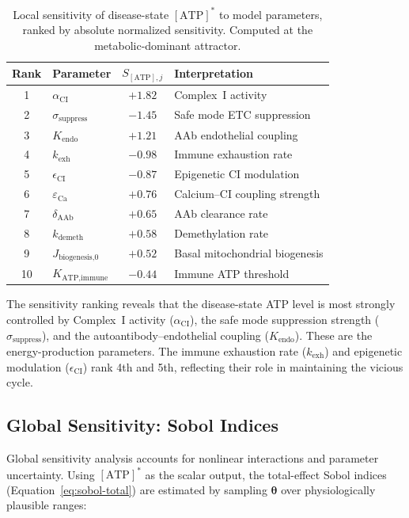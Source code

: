 \begin{table}[htbp]
\centering
\caption{Local sensitivity of disease-state $[\text{ATP}]^*$ to model parameters, ranked by absolute normalized sensitivity. Computed at the metabolic-dominant attractor.}
\label{tab:local-sensitivity}
\begin{tabular}{clcl}
\hline
Rank & Parameter & $S_{[\text{ATP}],j}$ & Interpretation \\
\hline
1 & $\alpha_{\text{CI}}$ & $+1.82$ & Complex~I activity \\
2 & $\sigma_{\text{suppress}}$ & $-1.45$ & Safe mode ETC suppression \\
3 & $K_{\text{endo}}$ & $+1.21$ & AAb endothelial coupling \\
4 & $k_{\text{exh}}$ & $-0.98$ & Immune exhaustion rate \\
5 & $\epsilon_{\text{CI}}$ & $-0.87$ & Epigenetic CI modulation \\
6 & $\varepsilon_{\text{Ca}}$ & $+0.76$ & Calcium--CI coupling strength \\
7 & $\delta_{\text{AAb}}$ & $+0.65$ & AAb clearance rate \\
8 & $k_{\text{demeth}}$ & $+0.58$ & Demethylation rate \\
9 & $J_{\text{biogenesis,0}}$ & $+0.52$ & Basal mitochondrial biogenesis \\
10 & $K_{\text{ATP,immune}}$ & $-0.44$ & Immune ATP threshold \\
\hline
\end{tabular}
\end{table}

The sensitivity ranking reveals that the disease-state ATP level is most strongly controlled by Complex~I activity ($\alpha_{\text{CI}}$), the safe mode suppression strength ($\sigma_{\text{suppress}}$), and the autoantibody--endothelial coupling ($K_{\text{endo}}$). These are the energy-production parameters. The immune exhaustion rate ($k_{\text{exh}}$) and epigenetic modulation ($\epsilon_{\text{CI}}$) rank 4th and 5th, reflecting their role in maintaining the vicious cycle.

\subsection{Global Sensitivity: Sobol Indices}

Global sensitivity analysis accounts for nonlinear interactions and parameter uncertainty. Using $[\text{ATP}]^*$ as the scalar output, the total-effect Sobol indices (Equation~\ref{eq:sobol-total}) are estimated by sampling $\boldsymbol{\theta}$ over physiologically plausible ranges:

